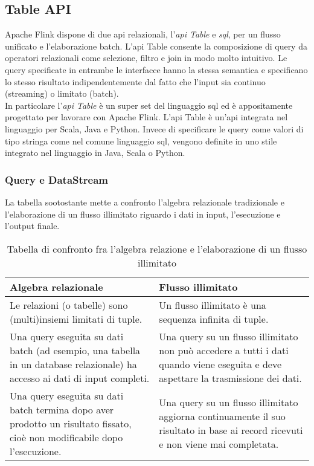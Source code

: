 \subsection{Table API}
Apache Flink dispone di due \gls{api} relazionali, l'\textit{\gls{api} Table} e \textit{\gls{sql}}, per un flusso unificato e l'elaborazione batch. L'\gls{api} Table consente la composizione di \gls{query} da operatori relazionali come selezione, filtro e join in modo molto intuitivo. Le \gls{query} specificate in entrambe le interfacce hanno la stessa semantica e specificano lo stesso risultato indipendentemente dal fatto che l'input sia continuo (streaming) o limitato (batch).\\
In particolare l'\textit{\gls{api} Table} è un super set del linguaggio \gls{sql} ed è appositamente progettato per lavorare con Apache Flink. L'\gls{api} Table è un'\gls{api} integrata nel linguaggio per Scala, Java e Python. Invece di specificare le \gls{query} come valori di tipo stringa come nel comune linguaggio \gls{sql}, vengono definite in uno stile integrato nel linguaggio in Java, Scala o Python.

\subsubsection{Query e DataStream}
La tabella sootostante mette a confronto l'algebra relazionale tradizionale e l'elaborazione di un flusso illimitato riguardo i dati in input, l'esecuzione e l'output finale.

\begin{table}[hbt!]
\caption{Tabella di confronto fra l'algebra relazione e l'elaborazione di un flusso illimitato}
\label{tab:algebraRelazionale-flussoIllimitato}
\begin{tabularx}{\textwidth}{XX}
\hline
\textbf{Algebra relazionale} & \textbf{Flusso illimitato}\\
\hline
Le relazioni (o tabelle) sono (multi)insiemi limitati di tuple.     & Un flusso illimitato è una sequenza infinita di tuple. \\
\hline
Una \gls{query} eseguita su dati batch (ad esempio, una tabella in un database relazionale) ha accesso ai dati di input completi.    & Una \gls{query} su un flusso illimitato non può accedere a tutti i dati quando viene eseguita e deve aspettare la trasmissione dei dati. \\
\hline
Una \gls{query} eseguita su dati batch termina dopo aver prodotto un risultato fissato, cioè non modificabile dopo l'esecuzione. & Una \gls{query} su un flusso illimitato aggiorna continuamente il suo risultato in base ai record ricevuti e non viene mai completata. \\
\hline
\end{tabularx}
\end{table}%

